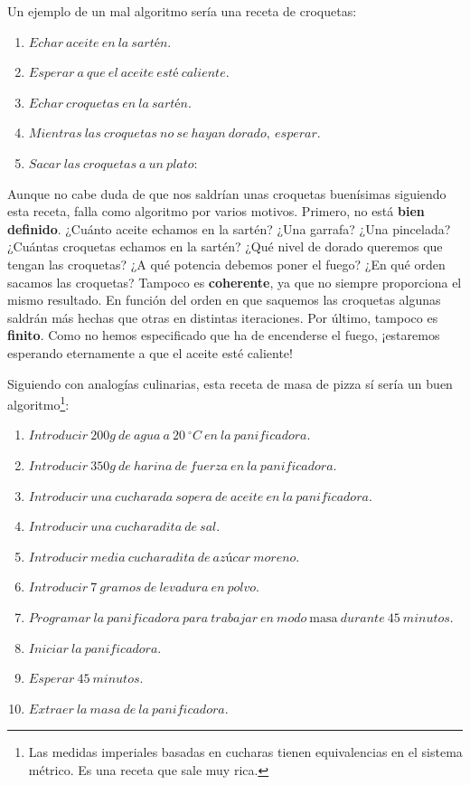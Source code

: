 Un ejemplo de un mal algoritmo sería una receta de croquetas:

\begin{enumerate}
	\item $Echar\ aceite\ en\ la\ sartén$.
	\item $Esperar\ a\ que\ el\ aceite\ esté\ caliente$.
	\item $Echar\ croquetas\ en\ la\ sartén$.
	\item $Mientras\ las\ croquetas\ no\ se\ hayan\ dorado,\ esperar$.
	\item $Sacar\ las\ croquetas\ a\ un\ plato$:
\end{enumerate}

Aunque no cabe duda de que nos saldrían unas croquetas buenísimas siguiendo esta receta, falla como algoritmo por varios motivos.
Primero, no está \textbf{bien definido}.
¿Cuánto aceite echamos en la sartén?
¿Una garrafa?
¿Una pincelada?
¿Cuántas croquetas echamos en la sartén?
¿Qué nivel de dorado queremos que tengan las croquetas?
¿A qué potencia debemos poner el fuego?
¿En qué orden sacamos las croquetas?
Tampoco es \textbf{coherente}, ya que no siempre proporciona el mismo resultado.
En función del orden en que saquemos las croquetas algunas saldrán más hechas que otras en distintas iteraciones.
Por último, tampoco es \textbf{finito}.
Como no hemos especificado que ha de encenderse el fuego, ¡estaremos esperando eternamente a que el aceite esté caliente!

Siguiendo con analogías culinarias, esta receta de masa de pizza sí sería un buen algoritmo\footnote{Las medidas imperiales basadas en cucharas tienen equivalencias en el sistema métrico. Es una receta que sale muy rica.}:

\begin{enumerate}
	\item $Introducir\ 200g\ de\ agua\ a\ 20\ ^{\circ}C\ en\ la\ panificadora$.
	\item $Introducir\ 350g\ de\ harina\ de\ fuerza\ en\ la\ panificadora$.
	\item $Introducir\ una\ cucharada\ sopera\ de\ aceite\ en\ la\ panificadora$.
	\item $Introducir\ una\ cucharadita\ de\ sal$.
	\item $Introducir\ media\ cucharadita\ de\ azúcar\ moreno$.
	\item $Introducir\ 7\ gramos\ de\ levadura\ en\ polvo$.
	\item $Programar\ la\ panificadora\ para\ trabajar\ en\ modo\ \text{masa}\ durante\ 45\ minutos$.
	\item $Iniciar\ la\ panificadora$.
	\item $Esperar\ 45\ minutos$.
	\item $Extraer\ la\ masa\ de\ la\ panificadora$.
\end{enumerate}

